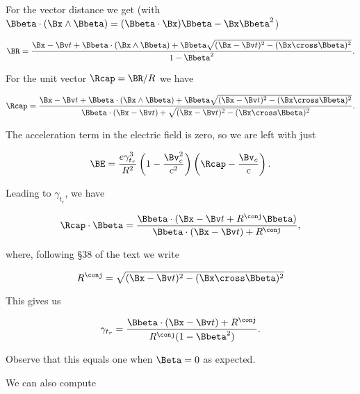 For the vector distance we get (with $\Bbeta \cdot (\Bx \wedge \Bbeta) = (\Bbeta \cdot \Bx) \Bbeta - \Bx \Bbeta^2$)

\begin{equation}\label{eqn:relElectroDynProblemSet5:730}
\BR = \frac{\Bx -\Bv t + \Bbeta \cdot (\Bx \wedge \Bbeta) + \Bbeta \sqrt{ (\Bx - \Bv t)^2 - (\Bx \cross \Bbeta)^2 }}{ 1 - \Bbeta^2 }.
\end{equation}

For the unit vector $\Rcap = \BR/R$ we have

\begin{equation}\label{eqn:relElectroDynProblemSet5:750}
\Rcap = \frac{\Bx - \Bv t + \Bbeta \cdot (\Bx \wedge \Bbeta) + \Bbeta \sqrt{ (\Bx - \Bv t)^2 - (\Bx \cross \Bbeta)^2 }}{ 
\Bbeta \cdot (\Bx - \Bv t) + \sqrt{ (\Bx - \Bv t)^2 - (\Bx \cross \Bbeta)^2 } 
}.
\end{equation}

The acceleration term in the electric field is zero, so we are left with just

\begin{equation}\label{eqn:relElectroDynProblemSet5:770}
\BE
= 
\frac{e \gamma_{t_r}^3}{R^2} 
\left( 1 - \frac{\Bv_c^2}{c^2} \right) 
\left( \Rcap - \frac{\Bv_c}{c} \right).
\end{equation}

Leading to $\gamma_{t_r}$, we have

\begin{equation}\label{eqn:relElectroDynProblemSet5:940}
\Rcap \cdot \Bbeta = \frac{\Bbeta \cdot (\Bx - \Bv t + R^\conj \Bbeta)}{\Bbeta \cdot (\Bx - \Bv t) + R^\conj},
\end{equation}

where, following \S 38 of the text we write

\begin{equation}\label{eqn:relElectroDynProblemSet5:960}
R^\conj = \sqrt{(\Bx - \Bv t)^2 - (\Bx \cross \Bbeta)^2 }
\end{equation}

This gives us

\begin{equation}\label{eqn:relElectroDynProblemSet5:790}
\gamma_{t_r} = 
\frac{\Bbeta \cdot (\Bx - \Bv t) + R^\conj}{R^\conj(1 - \Bbeta^2)}.
\end{equation}

Observe that this equals one when $\Beta = 0$ as expected.

We can also compute

